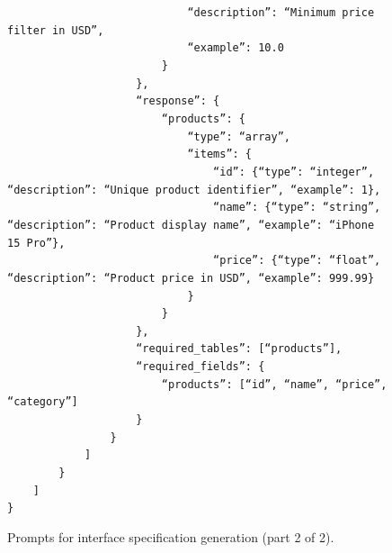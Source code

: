 \begin{figure}[p]
{\begin{minipage}{0.97\textwidth}
        \texttt{~~~~~~~~~~~~~~~~~~~~~~~~~~~~``description'': ``Minimum price filter in USD'',}\\
        \texttt{~~~~~~~~~~~~~~~~~~~~~~~~~~~~``example'': 10.0}\\
        \texttt{~~~~~~~~~~~~~~~~~~~~~~~~\}}\\
        \texttt{~~~~~~~~~~~~~~~~~~~~\},}\\
        \texttt{~~~~~~~~~~~~~~~~~~~~``response'': \{}\\
        \texttt{~~~~~~~~~~~~~~~~~~~~~~~~``products'': \{}\\
        \texttt{~~~~~~~~~~~~~~~~~~~~~~~~~~~~``type'': ``array'',}\\
        \texttt{~~~~~~~~~~~~~~~~~~~~~~~~~~~~``items'': \{}\\
        \texttt{~~~~~~~~~~~~~~~~~~~~~~~~~~~~~~~~``id'': \{``type'': ``integer'', ``description'': ``Unique product identifier'', ``example'': 1\},}\\
        \texttt{~~~~~~~~~~~~~~~~~~~~~~~~~~~~~~~~``name'': \{``type'': ``string'', ``description'': ``Product display name'', ``example'': ``iPhone 15 Pro''\},}\\
        \texttt{~~~~~~~~~~~~~~~~~~~~~~~~~~~~~~~~``price'': \{``type'': ``float'', ``description'': ``Product price in USD'', ``example'': 999.99\}}\\
        \texttt{~~~~~~~~~~~~~~~~~~~~~~~~~~~~\}}\\
        \texttt{~~~~~~~~~~~~~~~~~~~~~~~~\}}\\
        \texttt{~~~~~~~~~~~~~~~~~~~~\},}\\
        \texttt{~~~~~~~~~~~~~~~~~~~~``required\_tables'': [``products''],}\\
        \texttt{~~~~~~~~~~~~~~~~~~~~``required\_fields'': \{}\\
        \texttt{~~~~~~~~~~~~~~~~~~~~~~~~``products'': [``id'', ``name'', ``price'', ``category'']}\\
        \texttt{~~~~~~~~~~~~~~~~~~~~\}}\\
        \texttt{~~~~~~~~~~~~~~~~\}}\\
        \texttt{~~~~~~~~~~~~]}\\
        \texttt{~~~~~~~~\}}\\
        \texttt{~~~~]}\\
        \texttt{\}}

        \vspace{1pt}
        \end{minipage}
    }
    \captionsetup{labelformat=default, name=Figure}
    \caption{Prompts for interface specification generation (part 2 of 2).}
    \label{fig:gen-api-2}
\end{figure}
